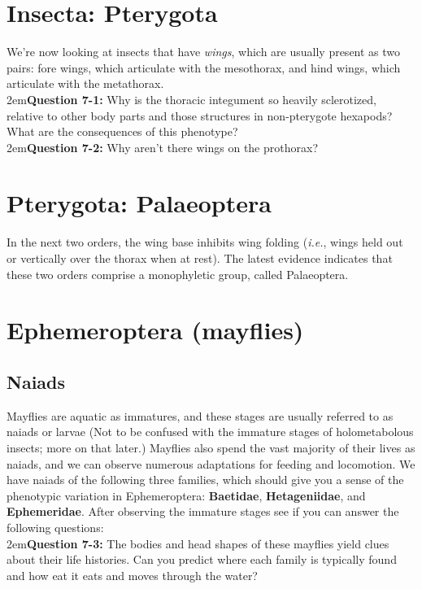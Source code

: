 \documentclass[letterpaper, 11pt]{article}
\begin{document}
\section*{Insecta: Pterygota}
We're now looking at insects that have \textit{wings}, which are usually present as two pairs: fore wings, which articulate with the mesothorax, and hind wings, which articulate with the metathorax.\\

\hangindent2em\textbf{Question 7-1:} Why is the thoracic integument so heavily sclerotized, relative to other body parts and those structures in non-pterygote hexapods? What are the consequences of this phenotype?\\

\hangindent2em\textbf{Question 7-2:} Why aren't there wings on the prothorax?

\section*{Pterygota: Palaeoptera}
In the next two orders, the wing base inhibits wing folding (\textit{i.e.}, wings held out or vertically over the thorax when at rest). The latest evidence indicates that these two orders comprise a monophyletic group, called Palaeoptera.

\section{Ephemeroptera (mayflies)}

\subsection{Naiads}
Mayflies are aquatic as immatures, and these stages are usually referred to as naiads or larvae (Not to be confused with the immature stages of holometabolous insects; more on that later.) Mayflies also spend the vast majority of their lives as naiads, and we can observe numerous adaptations for feeding and locomotion. We have naiads of the following three families, which should give you a sense of the phenotypic variation in Ephemeroptera: \textbf{Baetidae}, \textbf{Hetageniidae}, and \textbf{Ephemeridae}. After observing the immature stages see if you can answer the following questions:\\

\hangindent2em\textbf{Question 7-3:} The bodies and head shapes of these mayflies yield clues about their life histories. Can you predict where each family is typically found and how eat it eats and moves through the water?\\
\end{document}
